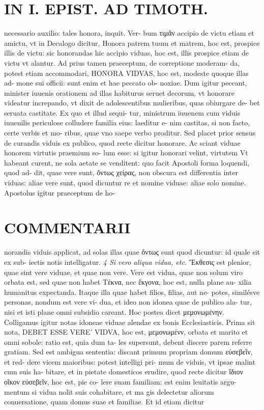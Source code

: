 \documentclass{article}
\begin{document}
\begin{pages}
\section*{IN I. EPIST. AD TIMOTH. }\pstart necessario auxilio: tales honora, inquit. Ver- bum τιμᾶν accipio de victu etiam et amictu, vt in Decalogo dicitur, Honora patrem tuum et matrem, hoc est, prospice illis de victu: sic honorandas hic accipio viduas, hoc est, illis prospice etiam de victu vt alantur. Ad prius tamen praeceptum, de correptione moderam- da, potest etiam accommodari, HONORA VIDVAS, hoc est, modeste quoque illas ad- mone sui officii: sunt enim et hae peccato ob- noxiae. Dum igitur peccant, minister iuuenis orationem ad illas habiturus seruet decorum, vt honorare videatur increpando, vt dixit de adolescentibus mulieribus, quas obiurgare de- bet seruata castitate. Ex quo et illud sequi- tur, ministrum iuuenem cum viduis iuuenilis periculose colludere familia eius: laeditur e- nim castitas, si non facto, certe verbis et mo- ribus, quae vno saepe verbo proditur.  \pend\pstart Sed placet prior sensus de curandis viduis ex publico, quod recte dicitur honorare. Ac sciant viduae honorem virtutis praemium so- lum esse: si igitur honorari velint, virtutem Vt habeant curent, ne sola aetate se venditent: quo facit Apostoli forma loquendi, quod ad- dit, quae vere sunt, ὄντως χείρας, non obscura est differentia inter viduas: aliae vere sunt, quod dicuntur re et nomine viduae: aliae solo nomine. Apostolus igitur praeceptum de ho-  \pend
\marginpar{[ p.121 ]}
\marginpar{[ p.122 ]}
\section*{COMMENTARII }\pstart norandis viduis applicat, ad solas illas quae ὄντως sunt quod dicuntur: id quale sit ex sub- iectis notis intelligatur.  \pend
\textit{4 Si vero aliqua vidua, etc. }\pstart Ἔκθεσις est plenior, quae sint vere viduae, et quae non vere. Vere est vidua, quae non solum viro orbata est, sed quae non habet Τέκνα, nec ἔκγονα, hoc est, nulla plane au- xilia humanitus expectanda.  \pend\pstart Itaque illa quae habet filios, filias, aut ne- potes, similésve personas, nondum est vere vi- dua, et ideo non idonea quae de publico ala- tur, nisi et isti plane omni subsidio careant. Hoc postea dicet μεμονωμένην. Colligamus igitur notas idoneae viduae alendae ex bonis Ecclesiasticis. Prima sit nota, DEBET ESSE VERE' VIDVA, hoc est, μεμονωμένν, orbata et marito et omni sobole: ratio est, quia dum ta- les supersunt, debent discere parem referre gratiam. Sed est ambigua sententia: discant primum propriam domum εύσεβεῖν, et red- dere vicem maioribus: potest intelligi pri- mum de viduis, vt ipsae malint cum suis ha- bitare, et in pietate domesticos erudire, quod recte dicitur ἴδιον οἴκον εὐσεβεῖν, hoc est, pie co- lere suam familiam: est enim leuitatis argu- mentum si vidua nolit suis cohabitare, et ma gis delectetur aliorum conuersatione, quam domus suae et familiae. Et id etiam dicitur  \pend

\end{pages}
\end{document}
